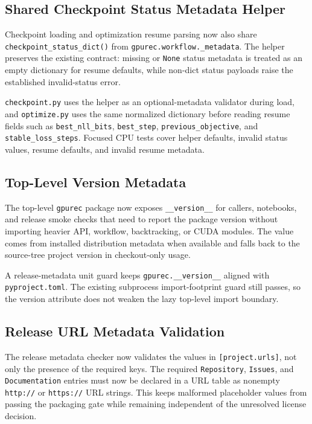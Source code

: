 \documentclass[11pt]{article}
\begin{document}
\subsection{Shared Checkpoint Status Metadata Helper}

Checkpoint loading and optimization resume parsing now also share
\texttt{checkpoint\_status\_dict()} from \texttt{gpurec.workflow.\_metadata}.
The helper preserves the existing contract: missing or \texttt{None} status
metadata is treated as an empty dictionary for resume defaults, while non-dict
status payloads raise the established invalid-status error.

\texttt{checkpoint.py} uses the helper as an optional-metadata validator during
load, and \texttt{optimize.py} uses the same normalized dictionary before
reading resume fields such as \texttt{best\_nll\_bits},
\texttt{best\_step}, \texttt{previous\_objective}, and
\texttt{stable\_loss\_steps}.  Focused CPU tests cover helper defaults,
invalid status values, resume defaults, and invalid resume metadata.

\subsection{Top-Level Version Metadata}

The top-level \texttt{gpurec} package now exposes \texttt{\_\_version\_\_} for
callers, notebooks, and release smoke checks that need to report the package
version without importing heavier API, workflow, backtracking, or CUDA modules.
The value comes from installed distribution metadata when available and falls
back to the source-tree project version in checkout-only usage.

A release-metadata unit guard keeps \texttt{gpurec.\_\_version\_\_} aligned with
\texttt{pyproject.toml}.  The existing subprocess import-footprint guard still
passes, so the version attribute does not weaken the lazy top-level import
boundary.

\subsection{Release URL Metadata Validation}

The release metadata checker now validates the values in
\texttt{[project.urls]}, not only the presence of the required keys.  The
required \texttt{Repository}, \texttt{Issues}, and \texttt{Documentation} entries
must now be declared in a URL table as nonempty \texttt{http://} or
\texttt{https://} URL strings.  This keeps malformed placeholder values from
passing the packaging gate while remaining independent of the unresolved license
decision.
\end{document}

